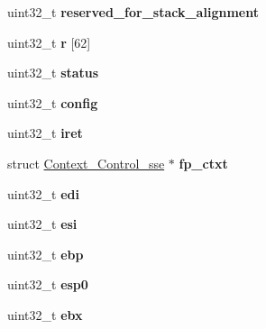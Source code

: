 \begin{DoxyCompactItemize}
uint32\+\_\+t {\bfseries reserved\+\_\+for\+\_\+stack\+\_\+alignment}
\item 
\mbox{\label{structCPU__Exception__frame_a05747117806154a191fef76e6c596e49}} 
uint32\+\_\+t {\bfseries r} \mbox{[}62\mbox{]}
\item 
\mbox{\label{structCPU__Exception__frame_a6c5dac00433976e83300408548abf635}} 
uint32\+\_\+t {\bfseries status}
\item 
\mbox{\label{structCPU__Exception__frame_a9383587a9db860c8f7ed5182bb192cc1}} 
uint32\+\_\+t {\bfseries config}
\item 
\mbox{\label{structCPU__Exception__frame_a609a2c1391a1846f22bba223c301ed7f}} 
uint32\+\_\+t {\bfseries iret}
\item 
\mbox{\label{structCPU__Exception__frame_a83a0c734ff8869aa7a017b235a68e690}} 
struct \mbox{\hyperlink{structContext__Control__sse}{Context\+\_\+\+Control\+\_\+sse}} $\ast$ {\bfseries fp\+\_\+ctxt}
\item 
\mbox{\label{structCPU__Exception__frame_a0d81552a8bef5e7c2bd2df5a3f1347f0}} 
uint32\+\_\+t {\bfseries edi}
\item 
\mbox{\label{structCPU__Exception__frame_a1717d38b80009a2416e1f8db1cb23e15}} 
uint32\+\_\+t {\bfseries esi}
\item 
\mbox{\label{structCPU__Exception__frame_a5ac9aef74d62b4b594d5ffd6f901b0f3}} 
uint32\+\_\+t {\bfseries ebp}
\item 
\mbox{\label{structCPU__Exception__frame_a531cfb0237de1886e52238130692893b}} 
uint32\+\_\+t {\bfseries esp0}
\item 
\mbox{\label{structCPU__Exception__frame_a197a1a5766c85a3c2d84608747b21b19}} 
uint32\+\_\+t {\bfseries ebx}
\item 
\mbox{\label{structCPU__Exception__frame_a88c3a37a4553cc59ac453d6f8ada5a20}} 

\end{DoxyCompactItemize}
